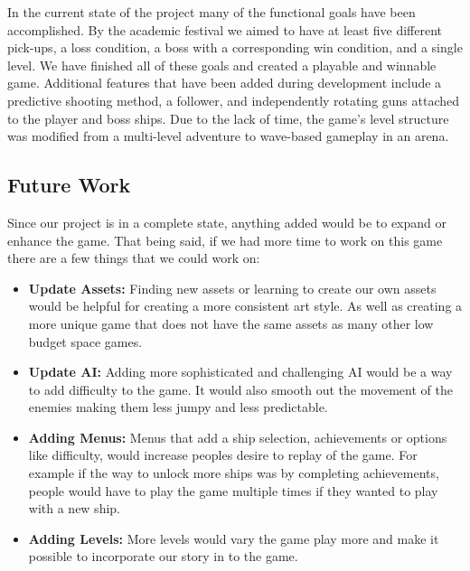 \documentclass[12pt]{article}       %
\begin{document}
In the current state of the project many of the functional goals have been accomplished. By the academic festival we aimed to have at least five different pick-ups, a loss condition, a boss with a corresponding win condition, and a single level. We have finished all of these goals and created a playable and winnable game. Additional features that have been added during development include a predictive shooting method, a follower, and independently rotating guns attached to the player and boss ships. Due to the lack of time, the game's level structure was modified from a multi-level adventure to wave-based gameplay in an arena.

\subsection{Future Work}
Since our project is in a complete state, anything added would be to expand or enhance the game. That being said, if we had more time to work on this game there are a few things that we could work on:
\begin{itemize} 
	\item {\bf Update Assets:} Finding new assets or learning to create our own assets would be helpful for creating a more consistent art style. As well as creating a more unique game that does not have the same assets as many other low budget space games.  
	\item {\bf Update AI:} Adding more sophisticated and challenging AI would be a way to add difficulty to the game. It would also smooth out the movement of the enemies making them less jumpy and less predictable. 
	\item {\bf Adding Menus:} Menus that add a  ship selection, achievements or  options like difficulty, would increase peoples desire to replay of the game. For example if the way to unlock more ships was by completing achievements, people would have to play the game multiple times if they wanted to play with a new ship.
	\item {\bf Adding Levels:} More levels would vary the game play more and make it possible to incorporate our story in to the game. 
\end{itemize}



\end{document}
